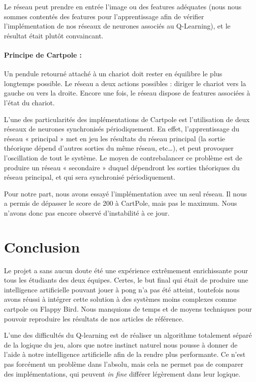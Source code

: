 \documentclass[
    10pt,
    a4paper,
    oneside,
    headinclude,footinclude,
    BCOR=5mm,
    captions=tableabove
]{scrartcl}
\begin{document}
Le réseau peut prendre en entrée l’image ou des features adéquates (nous nous sommes contentés des features pour l’apprentissage afin de vérifier l’implémentation de nos réseaux de neurones associés au Q-Learning), et le résultat était plutôt convaincant.

\paragraph{Principe de Cartpole :}
Un pendule retourné attaché à un chariot doit rester en équilibre le plus longtemps possible. Le réseau a deux actions possibles : diriger le chariot vers la gauche ou vers la droite. Encore une fois, le réseau dispose de features associées à l’état du chariot.

L’une des particularités des implémentations de Cartpole est l’utilisation de deux réseaux de neurones synchronisés périodiquement. En effet, l’apprentissage du réseau « principal » met en jeu les résultats du réseau principal (la sortie théorique dépend d’autres sorties du même réseau, etc…), et peut provoquer l’oscillation de tout le système. Le moyen de contrebalancer ce problème est de produire un réseau « secondaire » duquel dépendront les sorties théoriques du réseau principal, et qui sera synchronisé périodiquement.

Pour notre part, nous avons essayé l'implémentation avec un seul réseau. Il nous a permis de dépasser le score de 200 à CartPole, mais pas le maximum. Nous n'avons donc pas encore observé d'instabilité à ce jour.

\section*{Conclusion}
Le projet a sans aucun doute été une expérience extrêmement enrichissante pour tous les étudiants des deux équipes. Certes, le but final qui était de produire une intelligence artificielle pouvant jouer à pong n’a pas été atteint, toutefois nous avons réussi à intégrer cette solution à des systèmes moins complexes comme cartpole ou Flappy Bird. Nous manquions de temps et de moyens techniques pour pouvoir reproduire les résultats de nos articles de référence.

L'une des difficultés du Q-learning est de réaliser un algorithme totalement séparé de la logique du jeu, alors que notre instinct naturel nous pousse à donner de l'aide à notre intelligence artificielle afin de la rendre plus performante. Ce n'est pas forcément un problème dans l'absolu, mais cela ne permet pas de comparer des implémentations, qui peuvent \textit{in fine} différer légèrement dans leur logique.
\end{document}
